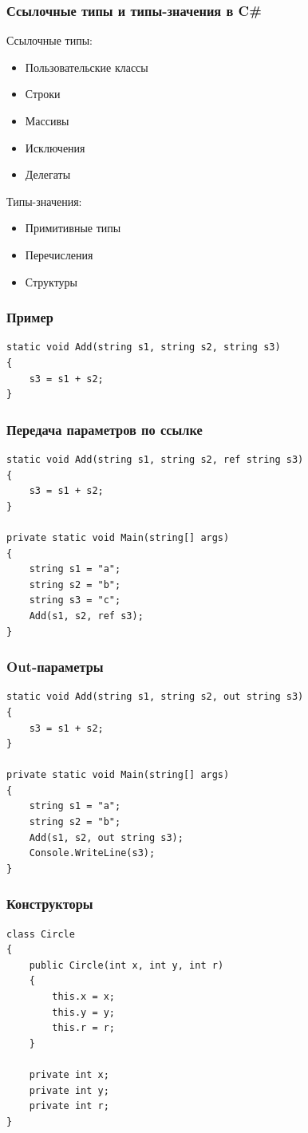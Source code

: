 \documentclass[xetex,mathserif,serif]{beamer}
\begin{document}
	\begin{frame}
		\frametitle{Ссылочные типы и типы-значения в C\#}
		Ссылочные типы:
		\begin{itemize}
			\item Пользовательские классы
			\item Строки
			\item Массивы
			\item Исключения
			\item Делегаты
		\end{itemize}

		Типы-значения:
		\begin{itemize}
			\item Примитивные типы
			\item Перечисления
			\item Структуры
		\end{itemize}
	\end{frame}
	
		\begin{frame}[fragile]
		\frametitle{Пример}
		\begin{verbatim}
static void Add(string s1, string s2, string s3)
{
    s3 = s1 + s2;
}
		\end{verbatim}
\end{frame}

	\begin{frame}[fragile]
		\frametitle{Передача параметров по ссылке}
		\begin{verbatim}
static void Add(string s1, string s2, ref string s3)
{
    s3 = s1 + s2;
}

private static void Main(string[] args)
{
    string s1 = "a";
    string s2 = "b";
    string s3 = "c";
    Add(s1, s2, ref s3);
}
		\end{verbatim}
\end{frame}

	\begin{frame}[fragile]
		\frametitle{Out-параметры}
		\begin{verbatim}
static void Add(string s1, string s2, out string s3)
{
    s3 = s1 + s2;
}

private static void Main(string[] args)
{
    string s1 = "a";
    string s2 = "b";
    Add(s1, s2, out string s3);
    Console.WriteLine(s3);
}
		\end{verbatim}
	\end{frame}

	\begin{frame}[fragile]
		\frametitle{Конструкторы}
		\begin{verbatim}
class Circle
{
    public Circle(int x, int y, int r)
    {
        this.x = x;
        this.y = y;
        this.r = r;
    }

    private int x;
    private int y;
    private int r;
}
		\end{verbatim}
	\end{frame}
\end{document}
